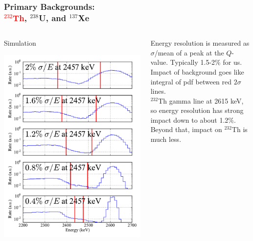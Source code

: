 \documentclass{beamer}
\begin{document}
\begin{frame}
\begin{center}
\frametitle{\hfill Primary Backgrounds:\\\hfill \textcolor{red}{$^{232}$Th}, $^{238}$U, and $^{137}$Xe}
\end{center}
\begin{columns}[T]
\begin{column}{.59\textwidth}
\vspace{-1cm}%
\begin{center}
Simulation
\end{center}
\vspace{-0.3cm}%
\includegraphics[keepaspectratio=true,width=\textwidth]{Th_Spectra_vs_Res.pdf}
\end{column}
\begin{column}{.41\textwidth}
\vspace{0.5cm}%

Energy resolution is measured as $\sigma$/mean of a peak at the $Q$-value.  Typically 1.5-2\% for us.\\[\baselineskip]

Impact of background goes like integral of pdf between red $2\sigma$ lines.\\[\baselineskip]

$^{232}$Th gamma line at 2615 keV, so energy resolution has strong impact down to about 1.2\%.\\[\baselineskip]

Beyond that, impact on $^{232}$Th is much less.
\end{column}
\end{columns}
\end{frame}
\end{document}
